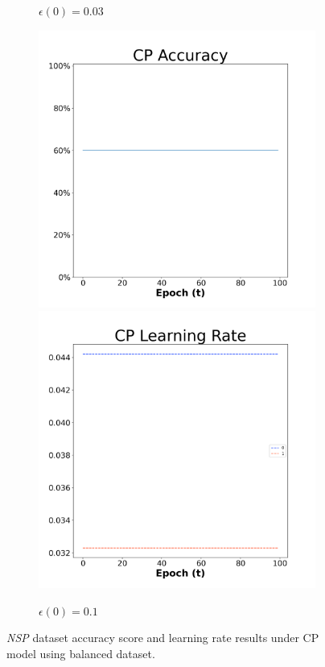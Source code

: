 \begin{figure}[H]
\begin{subfigure}{0.3\textwidth}
\caption{$\epsilon(0)=0.03$}
\end{subfigure}\hfil %
\begin{subfigure}{0.3\textwidth}
\includegraphics[width=\linewidth]{images/exper1/NSP/CP_0.1_acc.png}
\includegraphics[width=\linewidth]{images/exper1/NSP/CP_0.1_lr.png}
\caption{$\epsilon(0)=0.1$}
\end{subfigure}

\caption{\textit{NSP} dataset accuracy score and learning rate results under CP model using balanced dataset.}
\end{figure}

